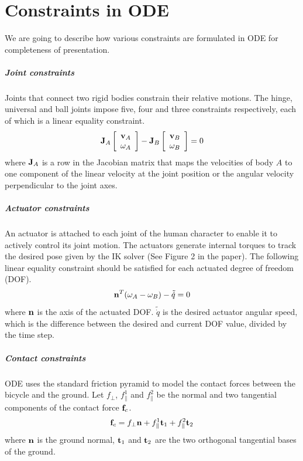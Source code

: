 \chapter{Constraints in ODE}
\label{chapter:AppendixB}
We are going to describe how various constraints are formulated in ODE for completeness of presentation.

\paragraph{Joint constraints} Joints that connect two rigid bodies constrain their relative motions.
The hinge, universal and ball joints impose five, four and three constraints respectively, each of which is a linear equality constraint.
\begin{equation}
\mathbf{J}_A
\left[\begin{array}{c}
\mathbf{v}_A \\
\mathbf{\omega}_A
\end{array}\right]-
\mathbf{J}_B
\left[\begin{array}{c}
\mathbf{v}_B \\
\mathbf{\omega}_B
\end{array}\right]
=0
\label{eq:jointConstraint}
\end{equation}
where $\mathbf{J}_A$ is a row in the Jacobian matrix that maps the velocities of body $A$ to one component of the linear velocity at the joint position or the angular velocity perpendicular to the joint axes.

\paragraph{Actuator constraints}
An actuator is attached to each joint of the human character to enable it to actively control its joint motion. The actuators generate internal torques to track the desired pose given by the IK solver (See Figure 2 in the paper). The following linear equality constraint should be satisfied for each actuated degree of freedom (DOF).
\begin{equation}
\mathbf{n}^T(\mathbf{\omega}_A-\mathbf{\omega}_B)-\tilde{\dot{q}}=0
\label{eq:actuatorConstraint}
\end{equation}
where $\mathbf{n}$ is the axis of the actuated DOF. $\tilde{\dot{q}}$ is the desired actuator angular speed, which is the difference between the desired and current DOF value, divided by the time step.

\paragraph{Contact constraints}
ODE uses the standard friction pyramid to model the contact forces between the bicycle and the ground. Let $f_\perp$, $f_{\parallel}^1$ and $f_{\parallel}^2$ be the normal and two tangential components of the contact force $\mathbf{f}_c$.
\begin{displaymath}
\mathbf{f}_c = f_\perp\mathbf{n}+f_{\parallel}^1\mathbf{t}_1+f_{\parallel}^2\mathbf{t}_2
\end{displaymath}
where $\mathbf{n}$ is the ground normal, $\mathbf{t}_1$ and $\mathbf{t}_2$ are the two orthogonal tangential bases of the ground.


